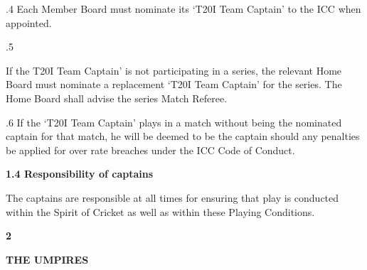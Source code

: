 \documentclass[12pt]{article}
\begin{document}
\vspace{\baselineskip}
{\fontsize{9pt}{10.8pt}.4 \tabto{0.49in} Each Member Board must nominate its ‘T20I Team Captain’ to the ICC when appointed.\par}\par


\vspace{\baselineskip}
\begin{adjustwidth}{0.5in}{0.22in}
{\fontsize{9pt}{10.8pt}.5 \tabto{0.49in} {\fontsize{8pt}{9.6pt}\selectfont If the T20I Team Captain’ is not participating in a series, the relevant Home Board must nominate a replacement ‘T20I Team Captain’ for the series. The Home Board shall advise the series Match Referee.\par}\par}\par

\end{adjustwidth}


\vspace{\baselineskip}
\begin{adjustwidth}{0.5in}{0.19in}
{\fontsize{9pt}{10.8pt}.6 \tabto{0.49in} If the ‘T20I Team Captain’ plays in a match without being the nominated captain for that match, he will be deemed to be the captain should any penalties be applied for over rate breaches under the ICC Code of Conduct.\par}\par

\end{adjustwidth}


\vspace{\baselineskip}
{\fontsize{11pt}{13.2pt}\selectfont \textbf{1.4 \tabto{0.47in} Responsibility of captains}\par}\par


\vspace{\baselineskip}
\begin{adjustwidth}{0.0in}{0.29in}
{\fontsize{9pt}{10.8pt}\selectfont The captains are responsible at all times for ensuring that play is conducted within the Spirit of Cricket as well as within these Playing Conditions.\par}\par

\end{adjustwidth}


\vspace{\baselineskip}
{\fontsize{16pt}{19.2pt}\selectfont \textbf{2 \tabto{0.29in} }{\fontsize{15pt}{18.0pt}\selectfont \textbf{THE UMPIRES}\par}\par}\par
\end{document}
